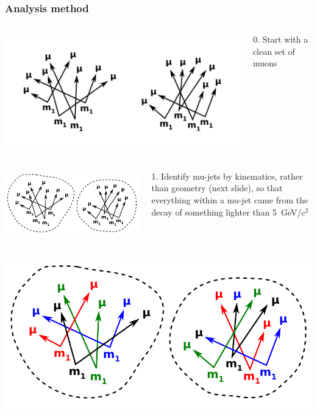 \documentclass[compress]{beamer}
\begin{document}
\begin{frame}
\frametitle{Analysis method}

\begin{columns}
\includegraphics[width=\linewidth]{combinatorics.pdf}

0. Start with a clean set of muons
\end{columns}

\begin{columns}
\includegraphics[width=\linewidth]{combinatorics2.pdf}

1. Identify mu-jets by kinematics, rather than geometry (next slide), so
that everything within a mu-jet came from the decay of something
lighter than 5~GeV/$c^2$
\end{columns}

\begin{columns}
\includegraphics[width=\linewidth]{combinatorics3.pdf}


\end{columns}
\end{frame}
\end{document}
